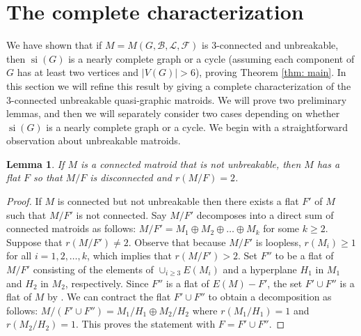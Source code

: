 \documentclass[12pt]{article}
\newtheorem{lemma}[theorem]{Lemma}
\theoremstyle{definition}
\theoremstyle{plain} %
\newcommand{\cB}{\mathcal{B}}
\newcommand{\cF}{\mathcal{F}}
\newcommand{\cL}{\mathcal{L}}
\DeclareMathOperator{\si}{si}
\begin{document}
\section{The complete characterization} \label{sec: characterization}

We have shown that if $M = M(G, \cB, \cL, \cF)$ is $3$-connected and unbreakable, then $\si(G)$ is a nearly complete graph or a cycle (assuming each component of $G$ has at least two vertices and $|V(G)| > 6$), proving Theorem \ref{thm: main}. 
In this section we will refine this result by giving a complete characterization of the $3$-connected unbreakable quasi-graphic matroids.
We will prove two preliminary lemmas, and then we will separately consider two cases depending on whether $\si(G)$ is a nearly complete graph or a cycle.
We begin with a straightforward observation about unbreakable matroids.


\begin{lemma} \label{lem: contract to rank 2}
    If $M$ is a connected matroid that is not unbreakable, then $M$ has a flat $F$ so that $M/F$ is disconnected and $r(M/F) = 2$.
\end{lemma}
\begin{proof}
If $M$ is connected but not unbreakable then there exists a flat $F'$ of $M$ such that $M/F'$ is not connected. Say $M/F'$ decomposes into a direct sum of connected matroids as follows: $M/F'= M_1 \oplus M_2 \oplus \ldots \oplus M_k$ for some $k \geq 2$. Suppose that $r(M/F') \neq 2$. Observe that because $M/F'$ is loopless, $r(M_i)\geq1$ for all $i=1,2,\ldots,k$, which implies that $r(M/F')> 2$. Set $F''$ to be a flat of $M/F'$ consisting of the elements of $\cup_{i \geq 3} E(M_i)$ and a hyperplane $H_1$ in $M_1$ and $H_2$ in $M_2$, respectively. Since $F''$ is a flat of $E(M)-F'$, the set $F' \cup F''$ is a flat of $M$ by \cite[Proposition~3.3.7]{Oxley2011}. We can contract the flat $F' \cup F''$ to obtain a decomposition as follows: $M/(F' \cup F'') = M_1\big/H_1\oplus M_2\big/H_2$ where $r(M_1/H_1)=1$ and $r(M_2/H_2)=1$. This proves the statement with $F = F' \cup F''$.
\end{proof}
\end{document}
